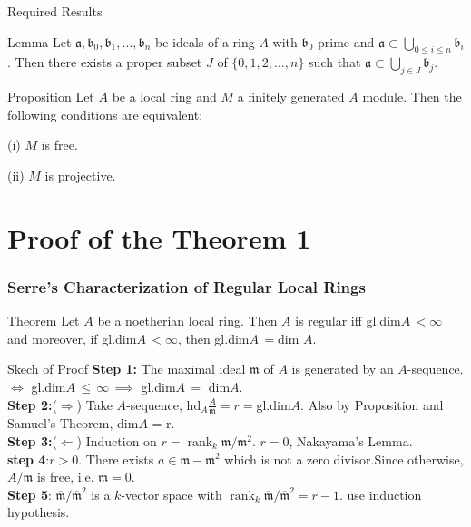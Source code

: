 \documentclass[
	11pt, %
]{beamer}
\newcommand{\T}{\text}							%
\newcommand{\B}{\textbf}						%
\newcommand{\Ra}{\Rightarrow}
\newcommand{\La}{\Leftarrow}
\newcommand{\mf}{\mathfrak}
\newcommand{\lda}{\Longleftrightarrow} 	%
\begin{document}
\begin{frame}{Required Results}
\begin{block}{Lemma}
Let $\mathfrak{a}, \mathfrak{b}_{0}, \mathfrak{b}_{1}, \ldots, \mathfrak{b}_{n}$ be ideals of a ring $A$ with $\mathfrak{b}_{0}$ prime and $\mathfrak{a} \subset \bigcup_{0 \leq i \leq n} \mathfrak{b}_{i}$. Then there exists a proper subset $J$ of $\{0,1,2, \ldots, n\}$ such that $\mathfrak{a} \subset \bigcup_{j \in J} \mathfrak{b}_{j}$.
\end{block}
\begin{block}{Proposition}
     Let $A$ be a local ring and $M$ a finitely generated $A$ module. Then the following conditions are equivalent:

    (i) $M$ is free.

    (ii) $M$ is projective.
\end{block}
\end{frame}
   
\section{Proof of the Theorem 1}

\begin{frame}
\small{
\frametitle{Serre's Characterization of Regular Local Rings}
\begin{block}{ Theorem }
    Let $A$ be a noetherian local ring. Then $A$ is regular iff gl.dim$A\,<\infty$  and moreover, if gl.dim$A\,<\infty$, then gl.dim$A\,=$dim $A$.
\end{block}
\pause
\begin{block}{Skech of Proof}
\B{Step 1:} The maximal ideal $\mf{m}$ of $A$ is generated by an $A$-sequence. $\lda$ gl.dim$A\, \leq\, \infty\, \implies$ gl.dim$A\, = \T{ dim}A$. 
\\
\B{Step 2:}($\Ra$) Take $A$-sequence, $\T{hd}_A \frac{A}{\mf{m}} = r = \T{gl.dim}A$. Also by Proposition and Samuel's Theorem, dim$A$ = r.
\\
\B{Step 3:}($\La$) Induction on $ r=\operatorname{rank}_{k} \mathfrak{m} / \mathfrak{m}^{2}$. $r = 0$, Nakayama's Lemma.
\\
\B{step 4}:$r>0$. There exists $a \in \mathfrak{m}-\mathfrak{m}^{2}$ which is not a zero divisor.Since otherwise, $A/\mf{m}$ is free, i.e. $\mf{m} = 0$.
\\
\B{Step 5}: $\overline{\mathfrak{m}} / \overline{\mathfrak{m}}^{2}$ is a $k$-vector space with $\operatorname{rank}_{k} \overline{\mathfrak{m}} / \overline{\mathfrak{m}}^{2} = r-1$. use induction hypothesis.
\end{block}
}
\end{frame}
\end{document}
